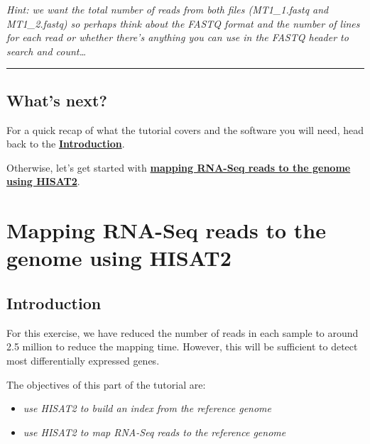 \documentclass[11pt]{article}
\providecommand{\tightlist}{%
      \setlength{\itemsep}{0pt}\setlength{\parskip}{0pt}}
\begin{document}
\textit{Hint: we want the total number of reads from both files
(MT1\_1.fastq and MT1\_2.fastq) so perhaps think about the FASTQ format
and the number of lines for each read or whether there's anything you
can use in the FASTQ header to search and count\ldots{}}

    \begin{center}\rule{0.5\linewidth}{.4pt}\end{center}

    \hypertarget{whats-next}{%
\subsection{What's next?}\label{whats-next}}

For a quick recap of what the tutorial covers and the software you will
need, head back to the \textbf{\href{index.ipynb}{Introduction}}.

Otherwise, let's get started with
\textbf{\href{genome-mapping.ipynb}{mapping RNA-Seq reads to the genome
using HISAT2}}.





\newpage





    \hypertarget{mapping-rna-seq-reads-to-the-genome-using-hisat2}{%
\section{Mapping RNA-Seq reads to the genome using
HISAT2}\label{mapping-rna-seq-reads-to-the-genome-using-hisat2}}

    \hypertarget{introduction}{%
\subsection{Introduction}\label{introduction}}

For this exercise, we have reduced the number of reads in each sample to
around 2.5 million to reduce the mapping time. However, this will be
sufficient to detect most differentially expressed genes.

The objectives of this part of the tutorial are:

\begin{itemize}
\tightlist
\item
  \textit{use HISAT2 to build an index from the reference genome}
\item
  \textit{use HISAT2 to map RNA-Seq reads to the reference genome}
\end{itemize}
\end{document}
